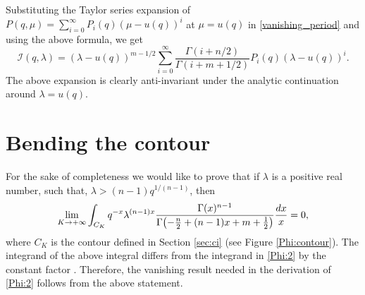 \documentclass[10pt,a4paper]{article}
\numberwithin{equation}{section}
\newcommand{\I}{\mathcal{I}}
\begin{document}
Substituting the Taylor series expansion of
$P(q,\mu)=\sum_{i=0}^\infty P_i(q) (\mu-u(q))^i$ at $\mu=u(q)$
in \eqref{vanishing_period} and using the above formula, we get
\[
\I(q,\lambda) = (\lambda-u(q))^{m-1/2}
\sum_{i=0}^\infty
\frac{\Gamma(i+n/2)}{ \Gamma(i+m+1/2)} P_i(q)
(\lambda-u(q))^i.
\]
The above expansion is clearly anti-invariant under the analytic
continuation around $\lambda=u(q)$.

\appendix

\section{Bending the contour} \label{app:bc}
For the sake of completeness we would like to prove that if $\lambda$ is a positive real number, such that, $\lambda>(n-1) q^{1/(n-1)}$, then
\[
\lim_{K\to +\infty} \int_{C_K}
q^{-x}\lambda^{(n-1)x}
\frac{ \Gamma(x)^{n-1} }{
\Gamma\bigl(-\frac{n}{2}+(n-1)x+m+\frac{1}{2} \bigr) }
\frac{{\rm d}x}{x} =0,
\]
where $C_K$ is the contour defined in Section \ref{sec:ci} (see Figure \ref{Phi:contour}). The integrand of the above integral differs from the integrand in \eqref{Phi:2} by the constant factor . Therefore, the vanishing result needed in the derivation of \eqref{Phi:2} follows from the above statement.
\end{document}
